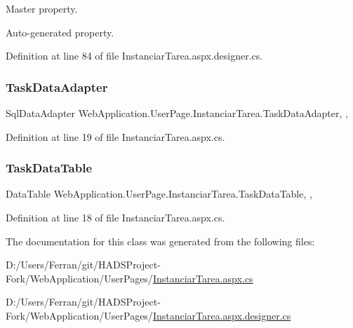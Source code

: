 Master property. 

Auto-\/generated property. 

Definition at line 84 of file Instanciar\+Tarea.\+aspx.\+designer.\+cs.

\mbox{\label{classWebApplication_1_1UserPage_1_1InstanciarTarea_a3fadf343ca9a543ed48897c69c7253a4}} 
\subsubsection{\texorpdfstring{TaskDataAdapter}{TaskDataAdapter}}
{\footnotesize\ttfamily Sql\+Data\+Adapter Web\+Application.\+User\+Page.\+Instanciar\+Tarea.\+Task\+Data\+Adapter\hspace{0.3cm}{\ttfamily [get]}, {\ttfamily [set]}, {\ttfamily [private]}}



Definition at line 19 of file Instanciar\+Tarea.\+aspx.\+cs.

\mbox{\label{classWebApplication_1_1UserPage_1_1InstanciarTarea_a079c2ac82dc950ae13a0ba75b015f9b7}} 
\subsubsection{\texorpdfstring{TaskDataTable}{TaskDataTable}}
{\footnotesize\ttfamily Data\+Table Web\+Application.\+User\+Page.\+Instanciar\+Tarea.\+Task\+Data\+Table\hspace{0.3cm}{\ttfamily [get]}, {\ttfamily [set]}, {\ttfamily [private]}}



Definition at line 18 of file Instanciar\+Tarea.\+aspx.\+cs.



The documentation for this class was generated from the following files\+:\begin{DoxyCompactItemize}
\item 
D\+:/\+Users/\+Ferran/git/\+H\+A\+D\+S\+Project-\/\+Fork/\+Web\+Application/\+User\+Pages/\mbox{\hyperlink{InstanciarTarea_8aspx_8cs}{Instanciar\+Tarea.\+aspx.\+cs}}\item 
D\+:/\+Users/\+Ferran/git/\+H\+A\+D\+S\+Project-\/\+Fork/\+Web\+Application/\+User\+Pages/\mbox{\hyperlink{InstanciarTarea_8aspx_8designer_8cs}{Instanciar\+Tarea.\+aspx.\+designer.\+cs}}\end{DoxyCompactItemize}
